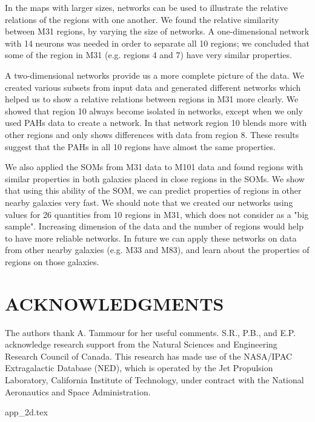 \documentclass[useAMS,usenatbib]{mn2e}
\begin{document}
In the maps with larger sizes, networks can be used to illustrate the relative relations of the regions with one another.
We found the relative similarity between M31 regions, by varying the size of networks.
A one-dimensional network with 14 neurons was needed in order to
separate all 10 regions; we concluded that some of the region in M31 (e.g. regions 4 and 7) have very similar properties.

A two-dimensional networks provide us a more complete picture of the data.
We created various subsets from input data and generated different networks which helped us to show a relative relations between regions in M31 more clearly.
We showed that region 10 always become isolated in networks, except when we only used PAHs data to create a network.
In that network region 10 blends more with other regions and only shows differences with data from region 8.
These results suggest that the PAHs in all 10 regions have almost the same properties.

We also applied the SOMs from M31 data to M101 data and found regions with similar properties in both galaxies placed in close regions in the SOMs.
We show that using this ability of the SOM, we can predict properties of regions in other nearby galaxies very fast.
We should note that we created our networks using values for 26 quantities from 10 regions in M31, which does not consider as a "big sample".
Increasing dimension of the data and the number of regions would help to have more reliable networks.
In future we can apply these networks on data from other nearby galaxies (e.g. M33 and M83), and learn about the properties of regions on those galaxies.

 

\section*{ACKNOWLEDGMENTS}
The authors thank A. Tammour for her useful comments. 
S.R., P.B., and E.P. acknowledge research support from the Natural Sciences and Engineering Research Council of Canada. This research has made use of the NASA/IPAC Extragalactic Database (NED), which is operated by the Jet Propulsion Laboratory, California Institute of Technology, under contract with the National Aeronautics and Space Administration.


{app_2d.tex}
\end{document}

